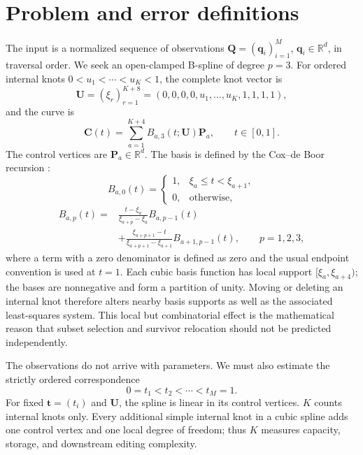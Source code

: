 \documentclass[preprint,12pt]{elsarticle}
\begin{document}
\section{Problem and error definitions}
The input is a normalized sequence of observations
$\bm Q=(\bm q_i)_{i=1}^M$, $\bm q_i\in\mathbb R^d$, in traversal order. We
seek an open-clamped B-spline of degree $p=3$. For ordered internal knots
$0<u_1<\cdots<u_K<1$, the complete knot vector is
\begin{equation}
\bm U=(\xi_r)_{r=1}^{K+8}
=(0,0,0,0,u_1,\ldots,u_K,1,1,1,1),
\end{equation}
and the curve is
\begin{equation}
\bm C(t)=\sum_{a=1}^{K+4}B_{a,3}(t;\bm U)\bm P_a,\qquad t\in[0,1].
\label{eq:bspline-curve}
\end{equation}
The control vertices are $\bm P_a\in\mathbb R^d$. The basis is defined by the
Cox--de Boor recursion \cite{piegl1997}:
\begin{equation}
B_{a,0}(t)=
\begin{cases}
1,& \xi_a\leq t<\xi_{a+1},\\
0,& \text{otherwise},
\end{cases}
\label{eq:bspline-zero}
\end{equation}
\begin{equation}
\begin{split}
B_{a,p}(t)={}&
\frac{t-\xi_a}{\xi_{a+p}-\xi_a}B_{a,p-1}(t)\\
&+\frac{\xi_{a+p+1}-t}{\xi_{a+p+1}-\xi_{a+1}}B_{a+1,p-1}(t),
\qquad p=1,2,3,
\end{split}
\label{eq:cox-de-boor}
\end{equation}
where a term with a zero denominator is defined as zero and the usual endpoint
convention is used at $t=1$. Each cubic basis function has local support
$[\xi_a,\xi_{a+4})$; the bases are nonnegative and form a partition of unity.
Moving or deleting an internal knot therefore alters nearby basis supports as
well as the associated least-squares system. This local but combinatorial
effect is the mathematical reason that subset selection and survivor
relocation should not be predicted independently.

The observations do not arrive with parameters. We must also estimate the
strictly ordered correspondence
\begin{equation}
0=t_1<t_2<\cdots<t_M=1.
\label{eq:parameter-order}
\end{equation}
For fixed $\bm t=(t_i)$ and $\bm U$, the spline is linear in its control
vertices. $K$ counts internal knots only. Every additional simple internal
knot in a cubic spline adds one control vertex and one local degree of freedom;
thus $K$ measures capacity, storage, and downstream editing complexity.
\end{document}
